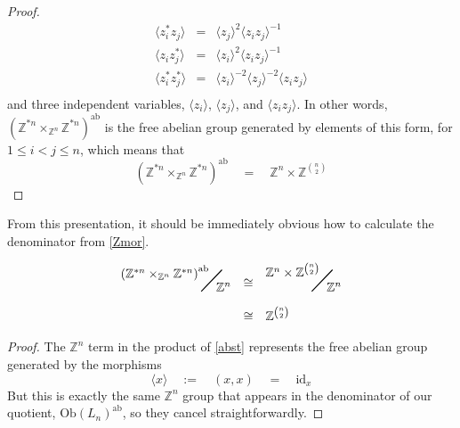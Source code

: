 \documentclass{amsbook} %
\newcommand{\bigquotient}[2]{ \raisebox{0.75\height}{$#1$} \mkern-12mu\scalebox{2}{$\diagup$}\mkern-10mu \raisebox{-0.5\height}{$#2$} }
\numberwithin{section}{chapter}
\begin{document}
\begin{proof}
\[\begin{array}{rll}
			\langle z_i^* z_j \rangle & = & \langle z_j \rangle^2 \langle z_i z_j \rangle^{-1} \\
			\langle z_i z_j^* \rangle & = & \langle z_i \rangle^2 \langle z_i z_j \rangle^{-1} \\
			\langle z_i^* z_j^* \rangle & = & \langle z_i \rangle^{-2} \langle z_j \rangle^{-2} \langle z_i z_j \rangle \\
		\end{array}
\]
and three independent variables, $\langle z_i \rangle$, $\langle z_j \rangle$, and $\langle z_i z_j \rangle$. In other words, $(\mathbb{Z}^{\ast n} \times_{\mathbb{Z}^n} \mathbb{Z}^{\ast n})^{\mathrm{ab}}$ is the free abelian group generated by elements of this form, for $1 \le i < j \le n$, which means that
\[ (\mathbb{Z}^{\ast n} \times_{\mathbb{Z}^n} \mathbb{Z}^{\ast n})^{\mathrm{ab}} \quad = \quad \mathbb{Z}^n \times \mathbb{Z}^{{n}\choose{2}} \]
\end{proof}

From this presentation, it should be immediately obvious how to calculate the denominator from \cref{Zmor}.

\begin{cor} \label{nchoose2}
\[ \begin{array}{rll}
			 \bigquotient{{(\mathbb{Z}^{\ast n} \times_{\mathbb{Z}^n} \mathbb{Z}^{\ast n})}^{\mathrm{ab}}}{\mathbb{Z}^n} & \cong & \bigquotient{\mathbb{Z}^n \times \mathbb{Z}^{{n}\choose{2}}}{\mathbb{Z}^n} \\[\bigskipamount]
			& \cong & \mathbb{Z}^{{n}\choose{2}} 
		\end{array}
\]
\end{cor}
\begin{proof}
The $\mathbb{Z}^n$ term in the product of \cref{abst} represents the free abelian group generated by the morphisms
\[ \langle x \rangle \quad := \quad (x,x) \quad = \quad \mathrm{id}_{x} \]
But this is exactly the same $\mathbb{Z}^n$ group that appears in the denominator of our quotient, $\mathrm{Ob}(L_n)^{\mathrm{ab}}$, so they cancel straightforwardly.
\end{proof}
\end{document}
